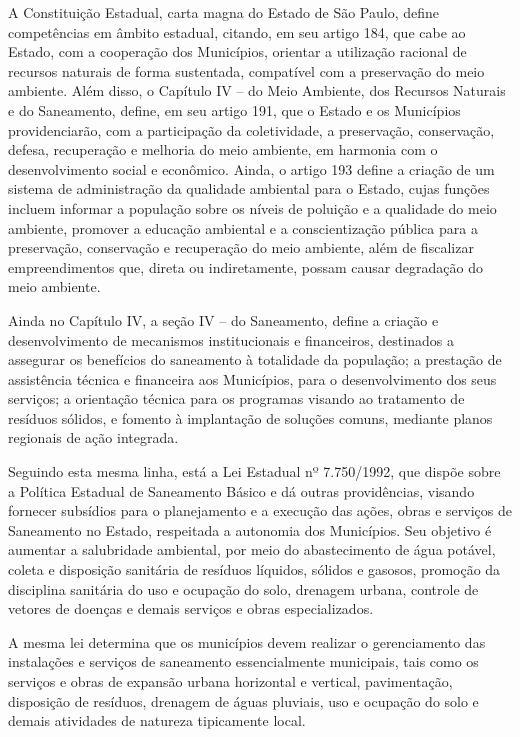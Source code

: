 	A Constituição Estadual, carta magna do Estado de São Paulo, define competências em âmbito estadual, citando, em seu artigo 184, que cabe ao Estado, com a cooperação dos Municípios, orientar a utilização racional de recursos naturais de forma sustentada, compatível com a preservação do meio ambiente. Além disso, o Capítulo IV – do Meio Ambiente, dos Recursos Naturais e do Saneamento, define, em seu artigo 191, que o Estado e os Municípios providenciarão, com a participação da coletividade, a preservação, conservação, defesa, recuperação e melhoria do meio ambiente, em harmonia com o desenvolvimento social e econômico. Ainda, o artigo 193 define a criação de um sistema de administração da qualidade ambiental para o Estado, cujas funções incluem informar a população sobre os níveis de poluição e a qualidade do meio ambiente, promover a educação ambiental e a conscientização pública para a preservação, conservação e recuperação do meio ambiente, além de fiscalizar empreendimentos que, direta ou indiretamente, possam causar degradação do meio ambiente.
	
	Ainda no Capítulo IV, a seção IV – do Saneamento, define a criação e desenvolvimento de mecanismos institucionais e financeiros, destinados a assegurar os benefícios do saneamento à totalidade da população; a prestação de assistência técnica e financeira aos Municípios, para o desenvolvimento dos seus serviços; a orientação técnica para os programas visando ao tratamento de resíduos sólidos, e fomento à implantação de soluções comuns, mediante planos regionais de ação integrada.
	
	Seguindo esta mesma linha, está a Lei Estadual nº 7.750/1992, que dispõe sobre a Política Estadual de Saneamento Básico e dá outras providências, visando fornecer subsídios para o planejamento e a execução das ações, obras e serviços de Saneamento no Estado, respeitada a autonomia dos Municípios. Seu objetivo é aumentar a salubridade ambiental, por meio do abastecimento de água potável, coleta e disposição sanitária de resíduos líquidos, sólidos e gasosos, promoção da disciplina sanitária do uso e ocupação do solo, drenagem urbana, controle de vetores de doenças e demais serviços e obras especializados.
	
	A mesma lei determina que os municípios devem realizar o gerenciamento das instalações e serviços de saneamento essencialmente municipais, tais como os serviços e obras de expansão urbana horizontal e vertical, pavimentação, disposição de resíduos, drenagem de águas pluviais, uso e ocupação do solo e demais atividades de natureza tipicamente local.
	
